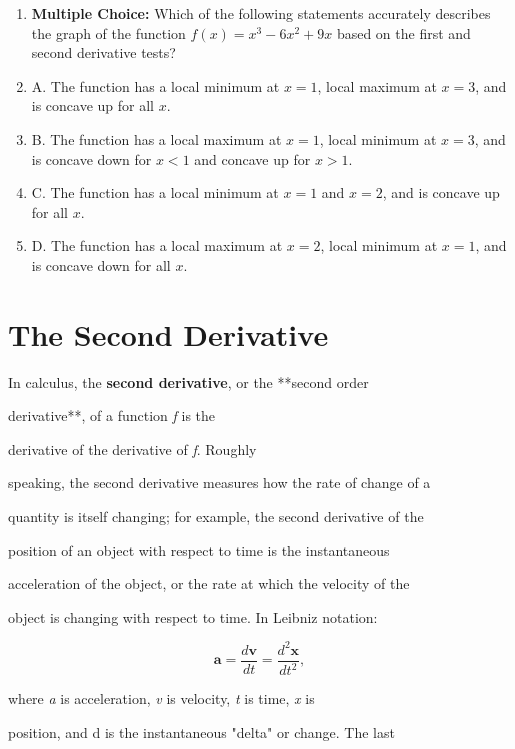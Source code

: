 \begin{enumerate}
    \item \textbf{Multiple Choice:} Which of the following statements accurately describes the graph of the function $f(x) = x^3 - 6x^2 + 9x$ based on the first and second derivative tests?
    \item A. The function has a local minimum at $x = 1$, local maximum at $x = 3$, and is concave up for all $x$.
    \item B. The function has a local maximum at $x = 1$, local minimum at $x = 3$, and is concave down for $x < 1$ and concave up for $x > 1$.
    \item C. The function has a local minimum at $x = 1$ and $x = 2$, and is concave up for all $x$.
    \item D. The function has a local maximum at $x = 2$, local minimum at $x = 1$, and is concave down for all $x$.
\end{enumerate}

\section{The Second Derivative}
\label{sec:the-second-derivative}

In calculus, the \textbf{second derivative}, or the **second order

derivative**, of a function \textit{f} is the

derivative of the derivative of \textit{f}. Roughly

speaking, the second derivative measures how the rate of change of a

quantity is itself changing; for example, the second derivative of the

position of an object with respect to time is the instantaneous

acceleration of the object, or the rate at which the velocity of the

object is changing with respect to time. In Leibniz notation:



$$\mathbf{a} =  \frac{d\mathbf{v}}{dt} = \frac{d^2\boldsymbol{x}}{dt^2},$$



where \textit{a} is acceleration, \textit{v} is velocity, \textit{t} is time, \textit{x} is

position, and d is the instantaneous "delta" or change. The last

